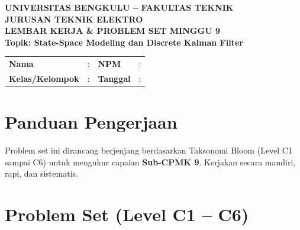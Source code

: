 \documentclass[11pt,a4paper]{article}
\begin{document}
\begin{center}
    {\large \textbf{\color{primaryblue}UNIVERSITAS BENGKULU -- FAKULTAS TEKNIK}}\\[0.1cm]
    {\large \textbf{\color{secondaryblue}JURUSAN TEKNIK ELEKTRO}}\\[0.25cm]
    {\LARGE \textbf{\color{primaryblue}LEMBAR KERJA \& PROBLEM SET MINGGU 9}}\\[0.1cm]
    {\normalsize \textbf{Topik: State-Space Modeling dan Discrete Kalman Filter}}
\end{center}

\vspace{0.2cm}

\begin{tcolorbox}[colback=boxbg,colframe=primaryblue,arc=2mm,title=\textbf{Identitas Mahasiswa}]
\small
\begin{tabular}{p{2.5cm}p{5.5cm}p{2.5cm}p{4.5cm}}
\textbf{Nama} & : \dotfill & \textbf{NPM} & : \dotfill \\
\textbf{Kelas/Kelompok} & : \dotfill & \textbf{Tanggal} & : \dotfill \\
\end{tabular}
\end{tcolorbox}

\vspace{0.2cm}

\section{Panduan Pengerjaan}
Problem set ini dirancang berjenjang berdasarkan Taksonomi Bloom (Level C1 sampai C6) untuk mengukur capaian \textbf{Sub-CPMK 9}. Kerjakan secara mandiri, rapi, dan sistematis.

\section{Problem Set (Level C1 -- C6)}
\end{document}
